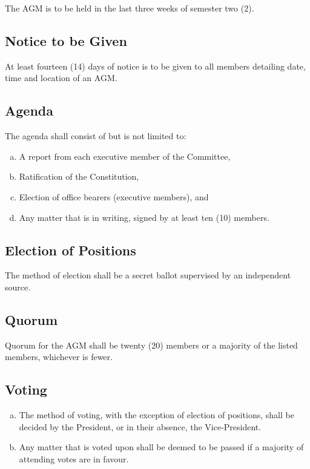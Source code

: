 \documentclass[a4paper,12pt]{article}
\begin{document}
The AGM is to be held in the last three weeks of semester two (2).

\subsection{Notice to be Given}

At least fourteen (14) days of notice is to be given to all members detailing date, time and location of an AGM.

\subsection{Agenda}

The agenda shall consist of but is not limited to:

\begin{enumerate}[a)]
	\item A report from each executive member of the Committee,
	\item Ratification of the Constitution,
	\item Election of office bearers (executive members), and
	\item Any matter that is in writing, signed by at least ten (10) members.
\end{enumerate}

\subsection{Election of Positions}

The method of election shall be a secret ballot supervised by an independent source.

\subsection{Quorum}

Quorum for the AGM shall be twenty (20) members or a majority of the listed members, whichever is fewer.

\subsection{Voting}

\begin{enumerate}[a)]
	\item The method of voting, with the exception of election of positions, shall be decided by the President, or in their absence, the Vice-President.
	\item Any matter that is voted upon shall be deemed to be passed if a majority of attending votes are in favour.
\end{enumerate}
\end{document}
